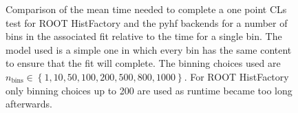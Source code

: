 \begin{figure}[htbp]
 \centering
 \hfil
 \hfil
 \caption{Comparison of the mean time needed to complete a one point CLs test for ROOT HistFactory and the pyhf backends for a number of bins in the associated fit relative to the time for a single bin.
  The model used is a simple one in which every bin has the same content to ensure that the fit will complete.
  The binning choices used are $n_{\text{bins}} \in \left\{1, 10, 50, 100, 200, 500, 800, 1000\right\}$.
  For ROOT HistFactory only binning choices up to 200 are used as runtime became too long afterwards.
 }
\end{figure}
